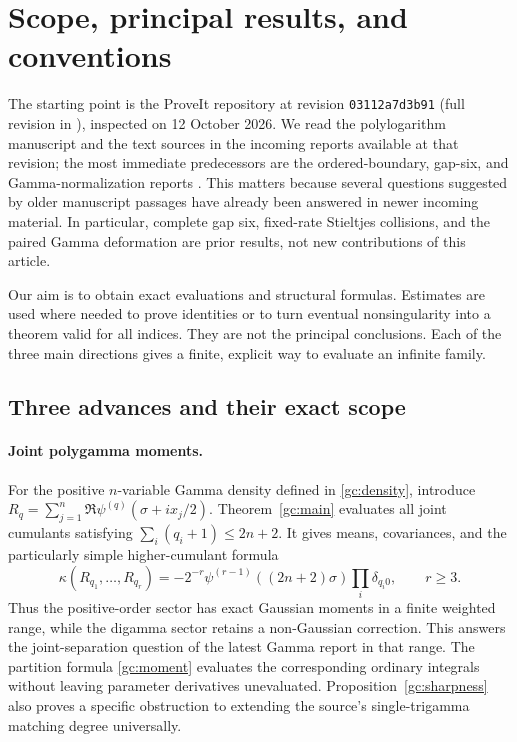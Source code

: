 \section{Scope, principal results, and conventions}
\label{intro:section}

The starting point is the ProveIt repository at revision
\texttt{03112a7d3b91} (full revision in \cite{ProveIt}), inspected on
12 October 2026. We read the polylogarithm manuscript and the text sources
in the incoming reports available at that revision; the most immediate
predecessors are the ordered-boundary, gap-six, and Gamma-normalization
reports \cite{ProveIt,OrderedIncoming,GapSix,GammaIncoming}.
This matters because several questions suggested by older manuscript
passages have already been answered in newer incoming material.
In particular, complete gap six, fixed-rate Stieltjes collisions, and
the paired Gamma deformation are prior results, not new contributions
of this article.

Our aim is to obtain exact evaluations and structural formulas. Estimates
are used where needed to prove identities or to turn eventual
nonsingularity into a theorem valid for all indices. They are not the
principal conclusions. Each of the three main directions gives a
finite, explicit way to evaluate an infinite family.

\subsection{Three advances and their exact scope}

\paragraph{Joint polygamma moments.}
For the positive $n$-variable Gamma density defined in
\eqref{gc:density}, introduce
$R_q=\sum_{j=1}^n\Re\psi^{(q)}(\sigma+ix_j/2)$.
Theorem~\ref{gc:main} evaluates all joint cumulants satisfying
$\sum_i(q_i+1)\le2n+2$. It gives means, covariances, and the particularly
simple higher-cumulant formula
\[
 \kappa(R_{q_1},\ldots,R_{q_r})
 =-2^{-r}\psi^{(r-1)}((2n+2)\sigma)
          \prod_i\delta_{q_i0},\qquad r\ge3.
\]
Thus the positive-order sector has exact Gaussian moments in a finite
weighted range, while the digamma sector retains a non-Gaussian
correction. This answers the joint-separation question of the latest
Gamma report in that range. The partition formula
\eqref{gc:moment} evaluates the corresponding ordinary integrals without
leaving parameter derivatives unevaluated. Proposition~\ref{gc:sharpness}
also proves a specific obstruction to extending the source's
single-trigamma matching degree universally.

